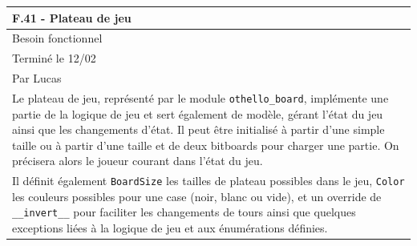 \documentclass[a4paper,12pt]{article}
\begin{document}
\vspace{1cm}

\noindent
\setlength{\arrayrulewidth}{1.5pt}
\renewcommand{\arraystretch}{1.5}
\begin{tabularx}{\textwidth}{|X|}
    \hline
    \textbf{F.41 - Plateau de jeu}                                                                                                                                                                                                                                                                                                                                                           \\
    \hline
    Besoin fonctionnel                                                                                                                                                                                                                                                                                                                                                                       \\
    \hline
    Terminé le 12/02                                                                                                                                                                                                                                                                                                                                                                         \\
    Par Lucas                                                                                                                                                                                                                                                                                                                                                                                \\
    \hline
    Le plateau de jeu, représenté par le module \texttt{othello\_board}, implémente une partie de la logique de jeu et sert également de modèle, gérant l’état du jeu ainsi que les changements d’état. Il peut être initialisé à partir d’une simple taille ou à partir d’une taille et de deux bitboards pour charger une partie. On précisera alors le joueur courant dans l’état du jeu. \\
    Il définit également \texttt{BoardSize} les tailles de plateau possibles dans le jeu, \texttt{Color} les couleurs possibles pour une case (noir, blanc ou vide), et un override de \texttt{\_\_invert\_\_} pour faciliter les changements de tours ainsi que quelques exceptions liées à la logique de jeu et aux énumérations définies.                                                 \\

\end{tabularx}
\end{document}
